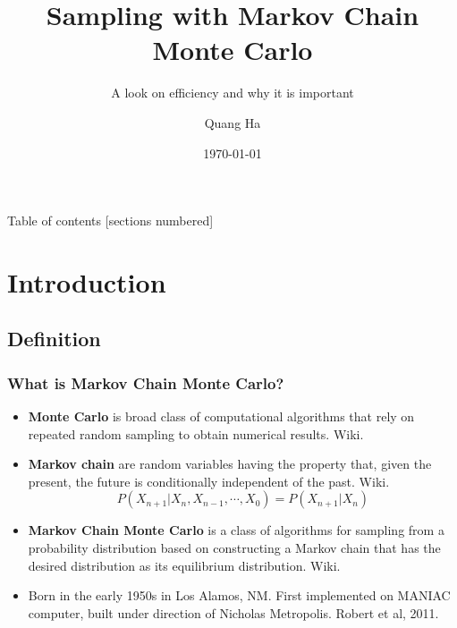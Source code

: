 \documentclass[10pt]{beamer}
\title{Sampling with Markov Chain Monte Carlo}
\subtitle{A look on efficiency and why it is important}
\date{\today}
\author{Quang Ha}
\begin{document}
\maketitle

\begin{frame}[plain]{Table of contents}
	[sections numbered]
	\tableofcontents[hideallsubsections]
\end{frame}	

\section{Introduction}
\subsection{Definition}

\begin{frame}
	\frametitle{What is Markov Chain Monte Carlo?}
	\begin{itemize}
		\item \textbf{Monte Carlo} is broad class of computational algorithms that rely on repeated random sampling to obtain numerical results. \tiny{Wiki}. \normalsize
		\item \textbf{Markov chain} are random variables having the property that, given the present, the future is conditionally independent of the past. \tiny{Wiki}. \normalsize
			\begin{equation*}
				P(X_{n+1}|X_{n}, X_{n-1}, \cdots, X_0) = P(X_{n+1}|X_{n})
			\end{equation*}
		\item \textbf{Markov Chain Monte Carlo} is a class of algorithms for sampling from a probability distribution based on constructing a Markov chain that has the desired distribution as its equilibrium distribution. \tiny{Wiki}. \normalsize
		\item Born in the early 1950s in Los Alamos, NM. First implemented on MANIAC computer, built under direction of Nicholas Metropolis. \tiny{Robert et al, 2011}. \normalsize
	\end{itemize}
\end{frame} 
\end{document}
